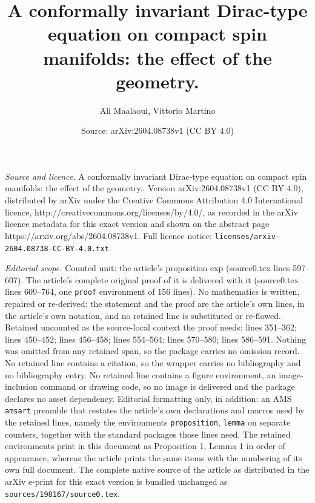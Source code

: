 \documentclass[10pt,a4paper]{amsart}
\title{A conformally invariant Dirac-type equation on compact spin manifolds: the effect of the geometry.}
\author{Ali Maalaoui, Vittorio Martino}
\date{Source: arXiv:2604.08738v1 (CC BY 4.0)}
\begin{document}
\maketitle

\noindent\emph{Source and licence.} A conformally invariant Dirac-type equation on compact spin manifolds: the effect of the geometry.. Version arXiv:2604.08738v1 (CC BY 4.0), distributed by arXiv under the Creative Commons Attribution 4.0 International licence, http://creativecommons.org/licenses/by/4.0/, as recorded in the arXiv licence metadata for this exact version and shown on the abstract page https://arxiv.org/abs/2604.08738v1. Full licence notice: \texttt{licenses/arxiv-2604.08738-CC-BY-4.0.txt}.\par\smallskip

\noindent\textit{Editorial scope.} Counted unit: the article's proposition exp (source0.tex lines 597--607). The article's complete original proof of it is delivered with it (source0.tex lines 609--764, one \texttt{proof} environment of 156 lines). No mathematics is written, repaired or re-derived: the statement and the proof are the article's own lines, in the article's own notation, and no retained line is substituted or re-flowed.  Retained uncounted as the source-local context the proof needs: lines 351--362; lines 450--452; lines 456--458; lines 554--564; lines 570--580; lines 586--591.  Nothing was omitted from any retained span, so the package carries no omission record.  No retained line contains a citation, so the wrapper carries no bibliography and no bibliography entry.  No retained line contains a figure environment, an image-inclusion command or drawing code, so no image is delivered and the package declares no asset dependency.  Editorial formatting only, in addition: an AMS \texttt{amsart} preamble that restates the article's own declarations and macros used by the retained lines, namely the environments \texttt{proposition}, \texttt{lemma} on separate counters, together with the standard packages those lines need.  The retained environments print in this document as Proposition 1, Lemma 1 in order of appearance, whereas the article prints the same items with the numbering of its own full document.  The complete native source of the article as distributed in the arXiv e-print for this exact version is bundled unchanged as \texttt{sources/198167/source0.tex}.
\end{document}
